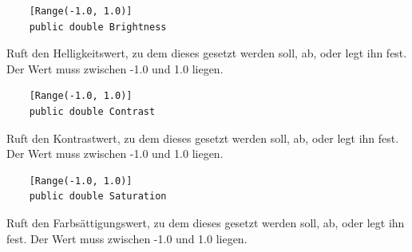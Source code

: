 \begin{itemize}

	\begin{verbatim}
	[Range(-1.0, 1.0)]
	public double Brightness
	\end{verbatim}
	Ruft den Helligkeitswert, zu dem dieses  gesetzt werden soll, ab, oder legt ihn fest. Der Wert muss zwischen -1.0 und 1.0 liegen.
	
	\begin{verbatim}
	[Range(-1.0, 1.0)]
	public double Contrast
	\end{verbatim}
	Ruft den Kontrastwert, zu dem dieses  gesetzt werden soll, ab, oder legt ihn fest. Der Wert muss zwischen -1.0 und 1.0 liegen.
	
	\begin{verbatim}
	[Range(-1.0, 1.0)]
	public double Saturation
	\end{verbatim}
	Ruft den Farbsättigungswert, zu dem dieses  gesetzt werden soll, ab, oder legt ihn fest. Der Wert muss zwischen -1.0 und 1.0 liegen.


\end{itemize}
